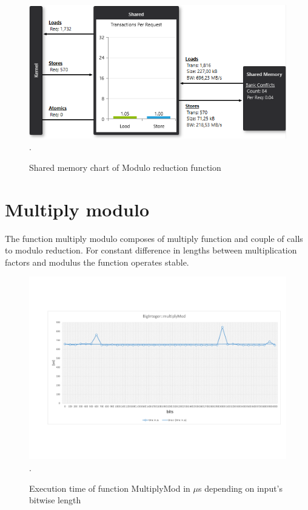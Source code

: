 \documentclass[oneside,openright,12pt,final,en]{mgr}
\begin{document}
\begin{figure}[H]
	\centering
	\includegraphics[width=\textwidth]{mod_shared}.
	\caption{Shared memory chart of Modulo reduction function}
	\label{fig:mod_shared}
\end{figure}

\section{Multiply modulo}


The function multiply modulo composes of multiply function and couple of calls to modulo reduction. For constant difference in lengths between multiplication factors and modulus the function operates stable.

\begin{figure}[H]
	\centering
	\includegraphics[width=\textwidth,trim={0.5cm 2.8cm 0.4cm 2.8cm},clip]{mull_mod.pdf}.
	\caption{Execution time of function MultiplyMod in $\mu$s depending on input's bitwise length}
	\label{fig:mull_mod}
\end{figure}
\end{document}
